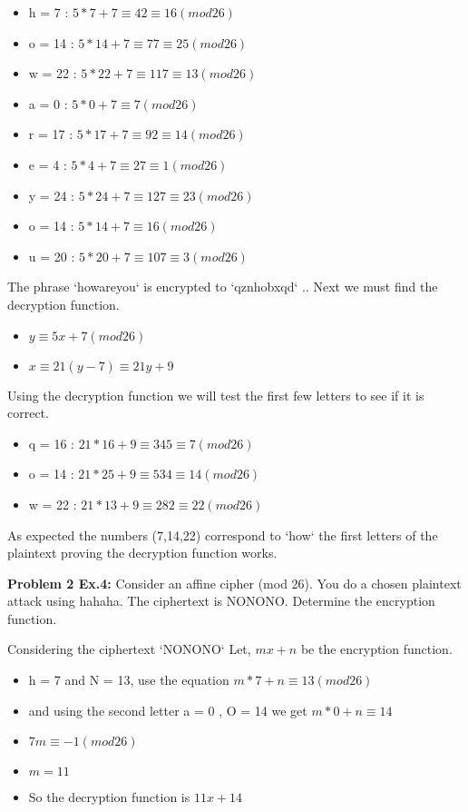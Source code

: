 \documentclass[12pt,letterpaper,final]{report}
\begin{document}
\begin{itemize}
\item h = 7 : $5 * 7 + 7 \equiv 42 \equiv 16 (mod 26)$
\item o = 14 : $5 * 14 + 7 \equiv 77 \equiv 25 (mod 26)$
\item w = 22 : $5 * 22 + 7 \equiv 117 \equiv 13 (mod 26)$
\item a = 0 : $5 * 0 + 7 \equiv 7 (mod 26)$
\item r = 17 : $5 * 17 + 7 \equiv 92 \equiv 14 (mod 26)$
\item e = 4 : $5 * 4 + 7 \equiv 27 \equiv 1 (mod 26)$
\item y = 24 : $5 * 24 + 7 \equiv 127 \equiv 23 (mod 26)$
\item o = 14 : $5 * 14 + 7 \equiv 16 (mod 26)$
\item u = 20 : $5 * 20 + 7 \equiv 107 \equiv 3 (mod 26)$
\end{itemize}
The phrase `howareyou` is encrypted to `qznhobxqd` .. Next we must find the decryption function. 
\begin{itemize}
\item $y \equiv 5x + 7 (mod 26)$
\item $x \equiv 21(y-7) \equiv 21y + 9$
\end{itemize}
Using the decryption function we will test the first few letters to see if it is correct. 
\begin{itemize}
\item q = 16 : $21 * 16 + 9 \equiv 345 \equiv 7 (mod 26)$
\item o = 14 : $21 * 25 + 9 \equiv 534 \equiv 14 (mod 26)$
\item w = 22 : $21 * 13 + 9 \equiv 282 \equiv 22(mod 26)$
\end{itemize}
As expected the numbers (7,14,22) correspond to `how` the first letters of the plaintext proving the decryption function works.

\bigskip
\noindent\textbf{Problem 2 Ex.4:} Consider an affine cipher (mod 26). You do a chosen plaintext attack
using hahaha. The ciphertext is NONONO. Determine the encryption function.

\indent Considering the ciphertext `NONONO` Let, $mx + n$ be the encryption function. 
\begin{itemize}
\item h = 7 and N = 13, use the equation $m * 7 + n \equiv 13 (mod 26)$
\item and using the second letter a = 0 , O = 14 we get $m * 0 + n \equiv 14$
\item $7m \equiv -1 (mod 26)$
\item $m = 11$
\item So the decryption function is $11x + 14$
\end{itemize}
\end{document}
